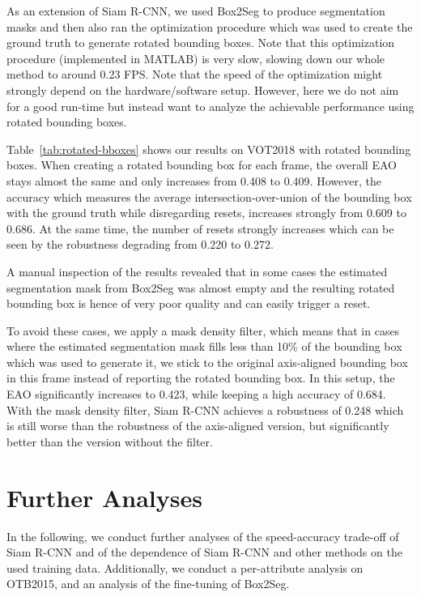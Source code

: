 \documentclass[10pt,twocolumn,letterpaper]{article}
\begin{document}
As an extension of Siam R-CNN, we used Box2Seg to produce segmentation masks and then also ran the optimization procedure which was used to create the ground truth to generate rotated bounding boxes. Note that this optimization procedure (implemented in MATLAB) is very slow, slowing down our whole method to around 0.23 FPS. Note that the speed of the optimization might strongly depend on the hardware/software setup. However, here we do not aim for a good run-time but instead want to analyze the achievable performance using rotated bounding boxes. 

Table~\ref{tab:rotated-bboxes} shows our results on VOT2018 with rotated bounding boxes. When creating a rotated bounding box for each frame, the overall EAO stays almost the same and only increases from 0.408 to 0.409. However, the accuracy which measures the average intersection-over-union of the bounding box with the ground truth while disregarding resets, increases strongly from 0.609 to 0.686. At the same time, the number of resets strongly increases which can be seen by the robustness degrading from 0.220 to 0.272. 

A manual inspection of the results revealed that in some cases the estimated segmentation mask from Box2Seg was almost empty and the resulting rotated bounding box is hence of very poor quality and can easily trigger a reset. 

To avoid these cases, we apply a mask density filter, which means that in cases where the estimated segmentation mask fills less than 10\% of the bounding box which was used to generate it, we stick to the original axis-aligned bounding box in this frame instead of reporting the rotated bounding box.
In this setup, the EAO significantly increases to 0.423, while keeping a high accuracy of 0.684. With the mask density filter, Siam R-CNN achieves a robustness of 0.248 which is still worse than the robustness of the axis-aligned version, but significantly better than the version without the filter.

\section{Further Analyses}
In the following, we conduct further analyses of the speed-accuracy trade-off of Siam R-CNN and of the dependence of Siam R-CNN and other methods on the used training data. Additionally, we conduct a per-attribute analysis on OTB2015, and an analysis of the fine-tuning of Box2Seg.
\end{document}

